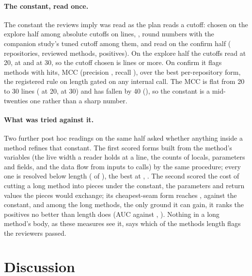 \documentclass[11pt,a4paper]{article}
\begin{document}
\paragraph{The constant, read once.} The constant the reviews imply was
read as the plan reads a cutoff: chosen on the explore half among
\lwNlocGridCount{} absolute cutoffs on lines, \lwNlocGrid{}, round numbers
with the companion study's tuned cutoff among them, and read on the confirm
half (\lwConfirmRepos{} repositories, \lwConfirmUnits{} reviewed methods,
\lwConfirmPositives{} positives). On the explore half the cutoffs read
\lwExploreTwentyMcc{} at 20, \lwExploreChosenMcc{} at \lwLengthCutoff{} and
\lwExploreThirtyMcc{} at 30, so the cutoff chosen is \lwLengthCutoff{} lines
or more. On confirm
it flags \lwLengthFlagged{} methods with \lwLengthHits{} hits, MCC
\lwLengthMccConfirm{} (precision \lwLengthPrecision{}, recall
\lwLengthRecall{}), \lwLengthVsRule{} over the best per-repository form,
the registered rule on length gated on any internal call. The MCC is flat
from 20 to 30 lines (\lwNlocTwentyMcc{} at 20, \lwNlocThirtyMcc{} at 30)
and has fallen by 40 (\lwNlocFortyMcc{}), so the constant is a mid-twenties
one rather than a sharp number.

\paragraph{What was tried against it.} Two further post hoc readings on
the same half asked whether anything inside a method refines that
constant. The first scored \lwHeldOutForms{} forms built from the method's
variables (the live width a reader holds at a line, the counts of locals,
parameters and fields, and the data flow from inputs to calls) by the same
procedure; every one is resolved below length (\lwFormsBelowLength{} of
\lwHeldOutForms{}), the best at \lwBestFormMcc{}, \lwBestFormVsLength{}.
The second scored the cost of cutting a long method into pieces under the
constant, the parameters and return values the pieces would exchange; its
cheapest-seam form reaches \splitCostMcc{}, \splitCostVsLength{} against
the constant, and among the \splitWithinN{} long methods, the only ground
it can gain, it ranks the \splitWithinPositives{} positives no better than
length does (AUC \splitCostAucWithin{} against \splitNlocAucWithin{},
\splitCostAucVsNloc{}).
Nothing in a long method's body, as these measures see it, says which of
the methods length flags the reviewers passed.

\section{Discussion}
\label{sec:disc}
\end{document}
